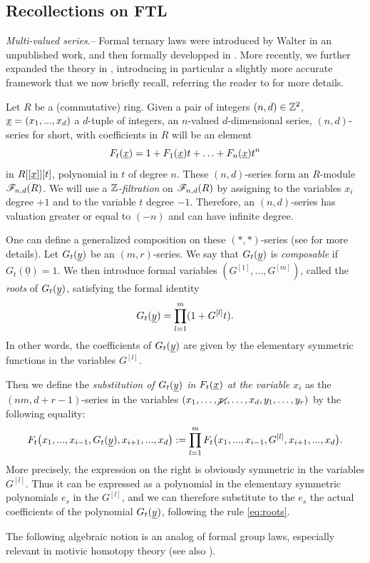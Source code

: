 \subsection{Recollections on FTL}

\begin{num}\label{num:multi-valued} \textit{Multi-valued series}.--
Formal ternary laws were introduced by Walter in an unpublished work,
 and then formally developped in \cite{DF3}. More recently, we further expanded the theory
 in \cite{CDFH}, introducing in particular a slightly more accurate framework that we now briefly recall,
 referring the reader to \cite[]{CDFH} for more details. 

 Let $R$ be a (commutative) ring. Given a pair of integers $(n,d) \in \mathbb{Z}^2$, $\underline x=(x_1,...,x_d)$ a $d$-tuple of integers,
 an $n$-valued $d$-dimensional series, $(n,d)$-series for short,
 with coefficients in $R$ will be an element 
$$
F_t(\underline x)=1+F_1(\underline x)t+\hdots+F_n(\underline x)t^n
$$
in $R[[\underline x]][t]$, polynomial in $t$ of degree $n$.
 These $(n,d)$-series form an $R$-module $\mathscr F_{n,d}(R)$.
 We will use a \emph{$\mathbb{Z}$-filtration} on $\mathscr F_{n,d}(R)$ by assigning to the variables $x_i$ degree $+1$
 and to the variable $t$ degree $-1$. Therefore, an $(n,d)$-series has valuation greater or equal to $(-n)$
 and can have infinite degree.

One can define a generalized composition on these $(*,*)$-series
 (see \cite[Def. 2.1.13]{CDFH} for more details).
 Let $G_t(\underline y)$ be an $(m,r)$-series. We say that $G_t(\underline y)$ is \emph{composable}
 if $G_t(\underline 0)=1$. We then introduce formal variables $(G^{[1]},\hdots,G^{[m]})$,
 called the \emph{roots} of $G_t(\underline y)$, satisfying the formal identity
\begin{equation}\label{eq:roots}
G_t(\underline y)=\prod_{l=1}^m (1+G^{[l]}t).
\end{equation}
In other words, the coefficients of $G_t(\underline y)$ are given by the elementary symmetric functions
 in the variables $G^{[l]}$.

Then we define the \emph{substitution of $G_t(\underline y)$ in $F_t(\underline x)$ at the variable $x_i$}
 as the $(nm,d+r-1)$-series in the variables $(x_1,\hdots,\cancel{x_i},\hdots,x_d,y_1,\hdots,y_r)$
 by the following equality:
$$
F_t\big(x_1,...,x_{i-1},G_t(\underline y),x_{i+1},...,x_d\big)
 :=\prod_{l=1}^m F_t\big(x_1,...,x_{i-1},G^{[l]},x_{i+1},...,x_d\big).
$$
More precisely, the expression on the right is obviously symmetric in the variables $G^{[l]}$.
 Thus it can be expressed as a polynomial in the elementary symmetric polynomials $e_s$ in the
 $G^{[l]}$, and we can therefore substitute to the $e_s$ the actual coefficients of the
 polynomial $G_t(\underline y)$, following the rule \eqref{eq:roots}.

The following algebraic notion is an analog of formal group laws,
 especially relevant in motivic homotopy theory (see also \cite[Def. 3.1.5]{CDFH}).
\end{num}
